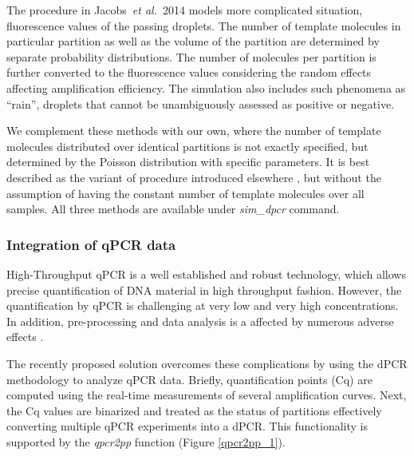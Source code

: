 \documentclass[a4,center,fleqn]{NAR}
\begin{document}
The procedure in Jacobs~\textit{et al.}~2014 models more complicated situation, 
fluorescence values of the passing droplets. The number of template molecules in 
particular partition as well as the volume of the partition are determined by 
separate probability distributions. The number of molecules per partition is 
further converted to the fluorescence values considering the random effects 
affecting amplification efficiency. The simulation also includes such phenomena 
as ``rain'', droplets that cannot be unambiguously assessed as positive or 
negative.

We complement these methods with our own, where the number of template molecules 
distributed over identical partitions is not exactly specified, but determined 
by the Poisson distribution with specific parameters. It is best described as 
the variant of procedure introduced elsewhere \cite{dube_mathematical_2008}, but 
without the assumption of having the constant number of template molecules over 
all samples. All three methods are available under \textit{sim\_dpcr} 
command.

\subsubsection{Integration of qPCR data}

High-Throughput qPCR is a well established and robust technology, which allows 
precise quantification of DNA material in high throughput fashion. However, the 
quantification by qPCR is challenging at very low and very high concentrations. 
In addition, pre-processing and data analysis is a affected by numerous adverse 
effects \cite{ruijter_2013, spiess_impact_2015}. 

The recently proposed solution \cite{mojtahedi_2014} overcomes these 
complications by using the dPCR methodology to analyze qPCR data. Briefly, 
quantification points (Cq) are computed using the real-time measurements of 
several amplification curves. Next, the Cq values are binarized and treated as 
the status of partitions effectively converting multiple qPCR experiments into a 
dPCR. This functionality is supported by the \textit{qpcr2pp} function (Figure 
\ref{qpcr2pp_1}).
\end{document}
